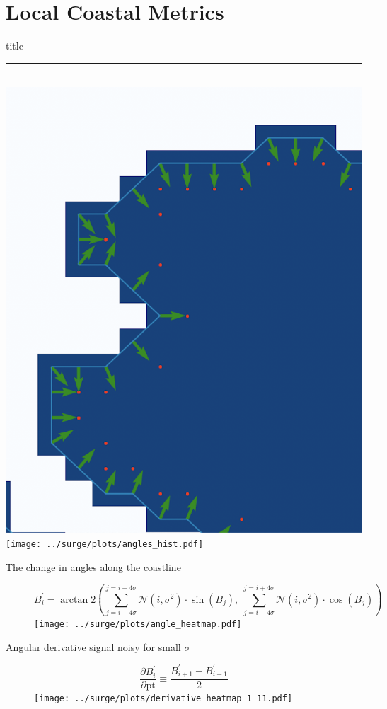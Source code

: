 \section{Local Coastal Metrics}
    \begin{frame}[plain]
        \vfill
      \centering
      \begin{beamercolorbox}[sep=8pt,center,shadow=true,rounded=true]{title}
        \insertsectionhead\par%
        \color{oxfordblue}\noindent\rule{10cm}{1pt} \\
        \includegraphics[width=0.4\linewidth]{images/example-images/new-orleans-example.png}
        \texttt{[image: ../surge/plots/angles\_hist.pdf]}
      \end{beamercolorbox}
      \vfill
  \end{frame}


\begin{frame}{The change in angles along the coastline}
\vspace{-20pt}
\begin{figure}[htb!]
    \centering
    \begin{equation}
B_i^{\prime}=\operatorname{arctan} 2\left(\sum_{j=i-4\sigma}^{j=i+4\sigma}
     \mathcal{N}(i, \sigma^{2})\cdot \sin{( B_{j})},\; \sum_{j=i-4\sigma}^{j=i+4\sigma}
      \mathcal{N}(i, \sigma^{2})\cdot  \cos{( B_{j})}\right)
\end{equation}
    \texttt{[image: ../surge/plots/angle\_heatmap.pdf]}
\end{figure}
\end{frame}


\begin{frame}{Angular derivative signal noisy for small $\sigma$}
\vspace{-20pt}
\begin{figure}[htb!]
    \centering
        \begin{equation}
        \frac{\partial B_i^{\prime}}{\partial \mathrm{pt}} \equiv \frac{B_{i+1}^{\prime}-B_{i-1}^{\prime}}{2}
\end{equation}
    \texttt{[image: ../surge/plots/derivative\_heatmap\_1\_11.pdf]}
\end{figure}
\end{frame}

